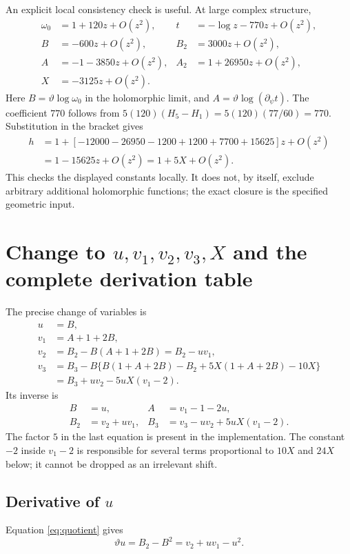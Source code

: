 \documentclass[11pt,a4paper]{article}
\numberwithin{equation}{section}
\newcommand{\tht}{\vartheta}
\newcommand{\del}{\partial}
\begin{document}
An explicit local consistency check is useful. At large complex structure,
\begin{align}
\omega_0&=1+120z+O(z^2),&
t&=-\log z-770z+O(z^2),\\
B&=-600z+O(z^2),& B_2&=3000z+O(z^2),\\
A&=-1-3850z+O(z^2),& A_2&=1+26950z+O(z^2),\\
X&=-3125z+O(z^2).
\end{align}
Here $B=\tht\log\omega_0$ in the holomorphic limit, and
$A=\tht\log(\del_\psi t)$. The coefficient $770$ follows from
$5(120)(H_5-H_1)=5(120)(77/60)=770$.
Substitution in the bracket gives
\begin{align}
h&=1+[-12000-26950-1200+1200+7700+15625]z+O(z^2)\\
 &=1-15625z+O(z^2)=1+5X+O(z^2).
\end{align}
This checks the displayed constants locally. It does not, by itself,
exclude arbitrary additional holomorphic functions; the exact closure
is the specified geometric input.

\section{Change to \texorpdfstring{$u,v_1,v_2,v_3,X$}{u, v1, v2, v3, X} and the complete derivation table}

The precise change of variables is
\begin{align}
u&=B,\\
v_1&=A+1+2B,\\
v_2&=B_2-B(A+1+2B)=B_2-uv_1,\\
v_3&=B_3-B\{B(1+A+2B)-B_2+5X(1+A+2B)-10X\}\\
   &=B_3+uv_2-5uX(v_1-2).
\label{eq:v3definition}
\end{align}
Its inverse is
\begin{equation}\boxed{\begin{aligned}
B&=u,&A&=v_1-1-2u,\\
B_2&=v_2+uv_1,&B_3&=v_3-uv_2+5uX(v_1-2).
\end{aligned}}\label{eq:inverse}
\end{equation}
The factor $5$ in the last equation is present in the implementation.
The constant $-2$ inside $v_1-2$ is responsible for several terms proportional
to $10X$ and $24X$ below; it cannot be dropped as an irrelevant shift.

\subsection{Derivative of \texorpdfstring{$u$}{u}}
Equation \eqref{eq:quotient} gives
\begin{equation}\boxed{\tht u=B_2-B^2=v_2+uv_1-u^2.}\end{equation}
\end{document}
